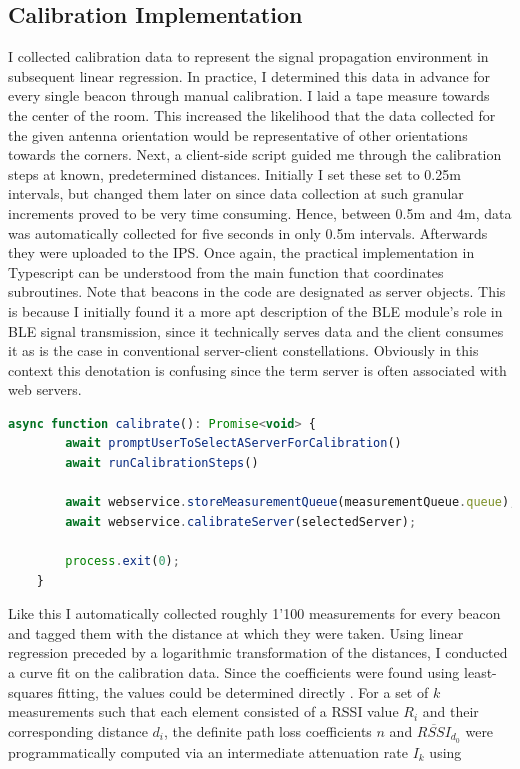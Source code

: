 \documentclass[a4paper, oneside]{ipsreport}
\begin{document}
\newpage
\subsection{Calibration Implementation}
I collected calibration data to represent the signal propagation environment in subsequent linear regression. In practice, I determined this data in advance for every single beacon through manual calibration. I laid a tape measure towards the center of the room. This increased the likelihood that the data collected for the given antenna orientation would be representative of other orientations towards the corners. Next, a client-side script guided me through the calibration steps at known, predetermined distances. Initially I set these set to 0.25m intervals, but changed them later on since data collection at such granular increments proved to be very time consuming. Hence, between 0.5m and 4m, data was automatically collected for five seconds in only 0.5m intervals. Afterwards they were uploaded to the IPS. Once again, the practical implementation in Typescript can be understood from the main function that coordinates subroutines. Note that beacons in the code are designated as server objects. This is because I initially found it a more apt description of the BLE module's role in BLE signal transmission, since it technically serves data and the client consumes it as is the case in conventional server-client constellations. Obviously in this context this denotation is confusing since the term server is often associated with web servers.

\begin{lstlisting}[language=JavaScript, caption=Calibration Function]
	async function calibrate(): Promise<void> {
		await promptUserToSelectAServerForCalibration()
		await runCalibrationSteps()

		await webservice.storeMeasurementQueue(measurementQueue.queue);
		await webservice.calibrateServer(selectedServer);

		process.exit(0);
	}
\end{lstlisting}


Like this I automatically collected roughly 1'100 measurements for every beacon and tagged them with the distance at which they were taken. Using linear regression preceded by a logarithmic transformation of the distances, I conducted a curve fit on the calibration data. Since the coefficients were found using least-squares fitting, the values could be determined directly \autocite{WolframAlpha}. For a set of $k$ measurements such that each element consisted of a RSSI value $R_i$ and their corresponding distance $d_i$, the definite path loss coefficients $n$ and $\overline{RSSI}_{d_0}$ were programmatically computed via an intermediate attenuation rate $I_k$ using
\end{document}
